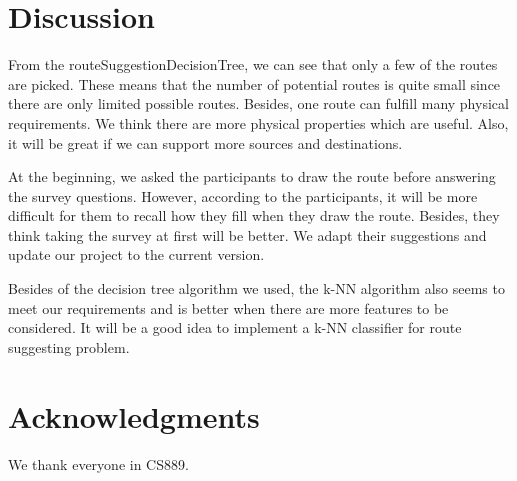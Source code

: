 \documentclass{sigchi}
\begin{document}
\section{Discussion}
From the routeSuggestionDecisionTree, we can see that only a few of the routes are picked. These means that the number of potential routes is quite small since there are only limited possible routes. Besides, one route can fulfill many physical requirements. We think there are more physical properties which are useful. Also, it will be great if we can support more sources and destinations.


At the beginning, we asked the participants to draw the route before answering the survey questions. However, according to the participants, it will be more difficult for them to recall how they fill when they draw the route. Besides, they think taking the survey at first will be better. We adapt their suggestions and update our project to the current version.


Besides of the decision tree algorithm we used, the k-NN algorithm also seems to meet our requirements and is better when there are more features to be considered. It will be a good idea to implement a k-NN classifier for route suggesting problem. 

\section{Acknowledgments}

We thank everyone in CS889.

\balance



\end{document}
